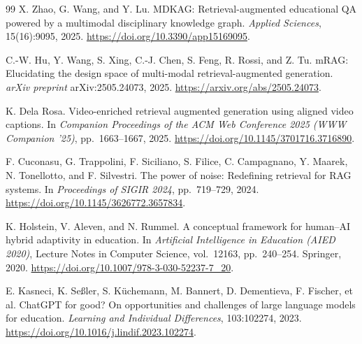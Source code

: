 \documentclass[manuscript,screen,nonacm]{acmart}
\begin{document}
\begin{thebibliography}{99}
X. Zhao, G. Wang, and Y. Lu.
\newblock MDKAG: Retrieval-augmented
educational QA powered by a multimodal
disciplinary knowledge graph.
\newblock \emph{Applied Sciences},
15(16):9095, 2025.
\newblock
\url{https://doi.org/10.3390/app15169095}.

C.-W. Hu, Y. Wang, S. Xing, C.-J. Chen,
S. Feng, R. Rossi, and Z. Tu.
\newblock mRAG: Elucidating the design space
of multi-modal retrieval-augmented generation.
\newblock \emph{arXiv preprint}
arXiv:2505.24073, 2025.
\newblock
\url{https://arxiv.org/abs/2505.24073}.

K. Dela Rosa.
\newblock Video-enriched retrieval augmented
generation using aligned video captions.
\newblock In \emph{Companion Proceedings of the
ACM Web Conference 2025 (WWW Companion '25)},
pp.~1663--1667, 2025.
\newblock
\url{https://doi.org/10.1145/3701716.3716890}.

F. Cuconasu, G. Trappolini, F. Siciliano,
S. Filice, C. Campagnano, Y. Maarek,
N. Tonellotto, and F. Silvestri.
\newblock The power of noise:
Redefining retrieval for RAG systems.
\newblock In \emph{Proceedings of SIGIR 2024},
pp.~719--729, 2024.
\newblock
\url{https://doi.org/10.1145/3626772.3657834}.

K. Holstein, V. Aleven, and N. Rummel.
\newblock A conceptual framework for human--AI
hybrid adaptivity in education.
\newblock In \emph{Artificial Intelligence
in Education (AIED 2020)},
Lecture Notes in Computer Science,
vol.~12163, pp.~240--254.
Springer, 2020.
\newblock
\url{https://doi.org/10.1007/978-3-030-52237-7_20}.

E. Kasneci, K. Se\ss{}ler, S. K\"uchemann,
M. Bannert, D. Dementieva, F. Fischer, et al.
\newblock ChatGPT for good? On opportunities
and challenges of large language models
for education.
\newblock \emph{Learning and Individual
Differences}, 103:102274, 2023.
\newblock
\url{https://doi.org/10.1016/j.lindif.2023.102274}.

\end{thebibliography}
\end{document}
